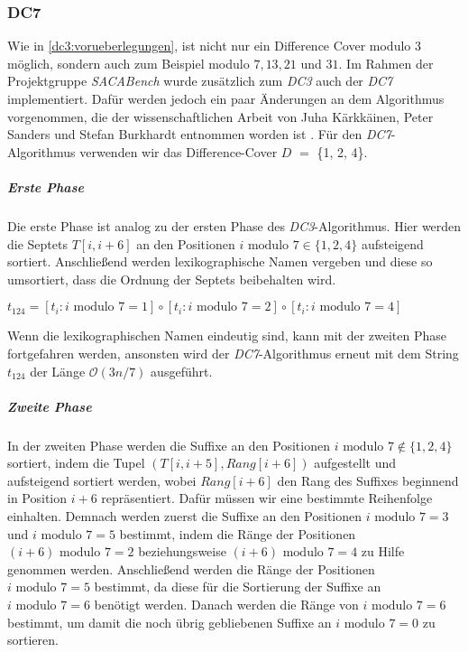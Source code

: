 \subsubsection{DC7}
\label{dc7}

Wie in \cref{dc3:vorueberlegungen}, ist nicht nur ein Difference Cover modulo $3$ möglich, sondern auch zum Beispiel modulo $7, 13, 21$ und $31$. Im Rahmen der Projektgruppe \emph{SACABench} wurde zusätzlich zum \emph{DC3} auch der \emph{DC7} implementiert. Dafür werden jedoch ein paar Änderungen an dem Algorithmus vorgenommen, die der wissenschaftlichen Arbeit von Juha Kärkkäinen, Peter Sanders und Stefan Burkhardt entnommen worden ist \cite{dc3:new}. Für den \emph{DC7}-Algorithmus verwenden wir das Difference-Cover \(D\) $=$ \{1, 2, 4\}.

\subparagraph*{Erste Phase}

Die erste Phase ist analog zu der ersten Phase des \emph{DC3}-Algorithmus. Hier werden die Septets $T[i,i+6]$ an den Positionen $i \text{ modulo } 7 \in \{1, 2, 4\}$ aufsteigend sortiert. Anschließend werden lexikographische Namen vergeben und diese so umsortiert, dass die Ordnung der Septets beibehalten wird.
\begin{center}
	$t_{124} = [t_i : i \text{ modulo } 7 = 1] \circ [t_i : i \text{ modulo } 7 = 2] \circ [t_i : i \text{ modulo } 7 = 4]$ 
\end{center}
Wenn die lexikographischen Namen eindeutig sind, kann mit der zweiten Phase fortgefahren werden, ansonsten wird der \emph{DC7}-Algorithmus erneut mit dem String $t_{124}$ der Länge $\mathcal{O}(3n/7)$ ausgeführt.

\subparagraph*{Zweite Phase}

In der zweiten Phase werden die Suffixe an den Positionen $i \text{ modulo } 7 \notin \{1, 2, 4\}$ sortiert, indem die Tupel $(T[i, i+5], Rang[i+6])$ aufgestellt und aufsteigend sortiert werden, wobei $Rang[i+6]$ den Rang des Suffixes beginnend in Position $i + 6$ repräsentiert. Dafür müssen wir eine bestimmte Reihenfolge einhalten. Demnach werden zuerst die Suffixe an den Positionen $i \text{ modulo } 7 = 3$ und $i \text{ modulo } 7 = 5$ bestimmt, indem die Ränge der Positionen $(i+6) \text{ modulo } 7 = 2$ beziehungsweise $(i+6) \text{ modulo } 7 = 4$ zu Hilfe genommen werden. Anschließend werden die Ränge der Positionen $i \text{ modulo } 7 = 5$ bestimmt, da diese für die Sortierung der Suffixe an $i \text{ modulo } 7 = 6$ benötigt werden. Danach werden die Ränge von $i \text{ modulo } 7 = 6$ bestimmt, um damit die noch übrig gebliebenen Suffixe an $i \text{ modulo } 7 = 0$ zu sortieren.

